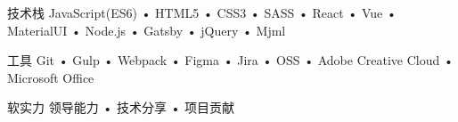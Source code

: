 

\begin{cvskills}

  \cvskill
    {技术栈} %
    {JavaScript(ES6) • HTML5 • CSS3 • SASS • React • Vue • MaterialUI • Node.js • Gatsby • jQuery • Mjml} %

  \cvskill
    {工具} %
    {Git • Gulp • Webpack • Figma • Jira • OSS • Adobe Creative Cloud • Microsoft Office} %

  \cvskill
    {软实力} %
    {领导能力 • 技术分享 • 项目贡献} %

\end{cvskills}
